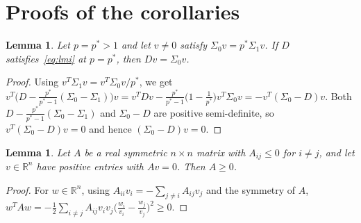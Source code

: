 \documentclass[11pt]{amsart}
\newtheorem{lemma}[theorem]{Lemma}
\theoremstyle{definition}
\newcommand{\R}{\mathbb{R}}
\begin{document}
\section{Proofs of the corollaries}
\begin{lemma}\label{lem:forced}
Let $p=p^*>1$ and let $v\ne0$ satisfy $\Sigma_0v=p^*\Sigma_1v$. If $D$ satisfies~\eqref{eq:lmi} at $p=p^*$, then
$Dv=\Sigma_0v$.
\end{lemma}

\begin{proof}
Using $v^T\Sigma_1v=v^T\Sigma_0v/p^*$, we get $v^T\big(D-\frac{p^*}{p^*-1}(\Sigma_0-\Sigma_1)\big)v
=v^TDv-\frac{p^*}{p^*-1}\big(1-\frac1{p^*}\big)v^T\Sigma_0v=-v^T(\Sigma_0-D)v$. Both
$D-\frac{p^*}{p^*-1}(\Sigma_0-\Sigma_1)$ and $\Sigma_0-D$ are positive semi-definite, so $v^T(\Sigma_0-D)v=0$ and
hence $(\Sigma_0-D)v=0$.
\end{proof}

\begin{lemma}\label{lem:Z}
Let $A$ be a real symmetric $n\times n$ matrix with $A_{ij}\le0$ for $i\ne j$, and let $v\in\R^n$ have positive
entries with $Av=0$. Then $A\ge0$.
\end{lemma}

\begin{proof}
For $w\in\R^n$, using $A_{ii}v_i=-\sum_{j\ne i}A_{ij}v_j$ and the symmetry of $A$,
$w^TAw=-\frac12\sum_{i\ne j}A_{ij}v_iv_j\big(\frac{w_i}{v_i}-\frac{w_j}{v_j}\big)^2\ge0$.
\end{proof}
\end{document}
